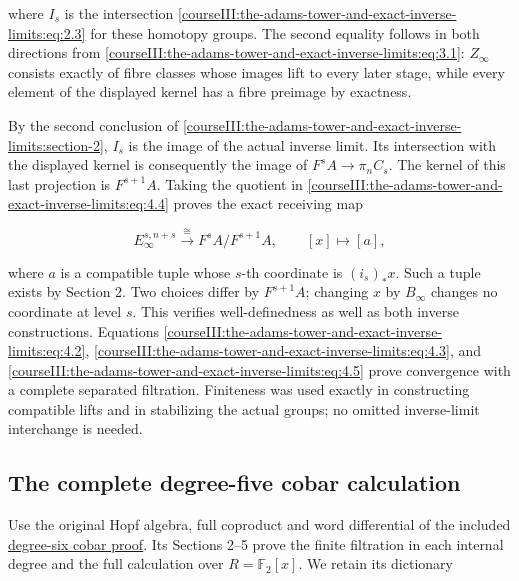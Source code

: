 where \(I_s\) is the intersection \eqref{courseIII:the-adams-tower-and-exact-inverse-limits:eq:2.3} for these homotopy groups. The second equality follows in both directions from \eqref{courseIII:the-adams-tower-and-exact-inverse-limits:eq:3.1}: \(Z_\infty\) consists exactly of fibre classes whose images lift to every later stage, while every element of the displayed kernel has a fibre preimage by exactness.

By the second conclusion of \cref{courseIII:the-adams-tower-and-exact-inverse-limits:section-2}, \(I_s\) is the image of the actual inverse limit. Its intersection with the displayed kernel is consequently the image of \(F^sA\to\pi_nC_s\). The kernel of this last projection is \(F^{s+1}A\). Taking the quotient in \eqref{courseIII:the-adams-tower-and-exact-inverse-limits:eq:4.4} proves the exact receiving map

\begin{equation}
E_\infty^{s,n+s}
 \xrightarrow{\cong}F^sA/F^{s+1}A,
 \qquad [x]\longmapsto [a],
 \label{courseIII:the-adams-tower-and-exact-inverse-limits:eq:4.5}
\end{equation}

where \(a\) is a compatible tuple whose \(s\)-th coordinate is \((i_s)_*x\). Such a tuple exists by Section 2. Two choices differ by \(F^{s+1}A\); changing \(x\) by \(B_\infty\) changes no coordinate at level \(s\). This verifies well-definedness as well as both inverse constructions. Equations \eqref{courseIII:the-adams-tower-and-exact-inverse-limits:eq:4.2}, \eqref{courseIII:the-adams-tower-and-exact-inverse-limits:eq:4.3}, and \eqref{courseIII:the-adams-tower-and-exact-inverse-limits:eq:4.5} prove convergence with a complete separated filtration. Finiteness was used exactly in constructing compatible lifts and in stabilizing the actual groups; no omitted inverse-limit interchange is needed.

\subsection{The complete degree-five cobar calculation}
\label{courseIII:the-adams-tower-and-exact-inverse-limits:adams-degree-five-cobar}

\label{courseIII:the-adams-tower-and-exact-inverse-limits:section-5}\label{courseIII:adams-tower:5}

Use the original Hopf algebra, full coproduct and word differential of the included \href{https://github.com/KokunoYumeto/open-math-courses/blob/98715557b25d715076184ec098089ebae34ea9f6/docs/courses/CG-S6/src/the-degree-six-milnor-cobar-calculation.md}{degree-six cobar proof}. Its Sections 2--5 prove the finite filtration in each internal degree and the full calculation over \(R=\mathbb F_2[x]\). We retain its dictionary

